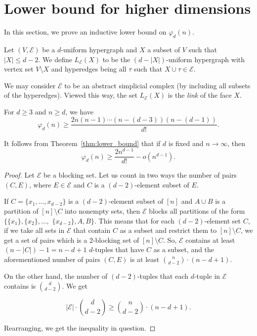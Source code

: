 \documentclass[11pt,a4paper]{article}
\begin{document}
\section{Lower bound for higher dimensions}\label{sec:lbhighd}

In this section, we prove an inductive lower bound on $\varphi_d(n)$.

\begin{definition}
    Let $(V,\mathcal{E})$ be a $d$-uniform hypergraph and $X$ a subset of $V$ such that $\lvert X \rvert \leq d-2$. We define $L_{\mathcal{E}}(X)$ to be the $(d-|X|)$-uniform hypergraph with vertex set $V \setminus X$ and hyperedges being all $\tau$ such that $X \cup \tau \in \mathcal{E}$.
\end{definition}
We may consider $\mathcal{E}$ to be an abstract simplicial complex (by including all subsets of the hyperedges). Viewed this way, the set $L_{\mathcal{E}}(X)$ is the {\em link} of the face $X$.


\begin{theorem}
\label{thm:lower_bound}
    For $d \geq 3$ and $n \geq d$, we have
    \[\varphi_d(n) \geq \frac{ 2 n (n-1) \cdots (n-(d-3)) (n-(d-1))}{d!}.\]
\end{theorem}
It follows from Theorem~\ref{thm:lower_bound} that if $d$ is fixed and $n\to \infty$, then
\[
    \varphi_d(n) \geq \frac{2 n^{d-1}}{d!} -o(n^{d-1}).
\]

\begin{proof}
    Let $\mathcal{E}$ be a blocking set. Let us count in two ways the number of pairs $(C,E)$, where $E\in \mathcal{E}$ and $C$ is a $(d-2)$-element subset of $E$.


    If $C=\{x_1,\dots,x_{d-2}\}$ is a $(d-2)$-element subset of  $[n]$ and $A\cup B$ is a partition of $[n]\setminus C$ into nonempty sets, then
    $\mathcal{E}$ blocks all partitions of the form $\{\{x_1\},\{x_2\},\dots,$ $\{x_{d-2}\},A,B\}$. This means that for each $(d-2)$-element set  $C$, if we take all sets in $\mathcal{E}$ that contain $C$ as a subset and restrict them to $[n]\setminus C$, we get a set of pairs which is a 2-blocking set of $[n]\setminus C$. So, $\mathcal{E}$ contains at least $(n-|C|)-1=n-d+1$ $d$-tuples that have $C$ as a subset, and the aforementioned number of pairs $(C,E)$ is at least $\binom{n}{d-2} \cdot (n-d+1)$.

    On the other hand, the number of $(d-2)$-tuples that each $d$-tuple in $\mathcal{E}$ contains is $\binom{d}{d-2}$. We get

    \[ |\mathcal{E}|\cdot \binom{d}{d-2}\geq \binom{n}{d-2}\cdot (n-d+1).
    \]

    Rearranging, we get the inequality in question.
\end{proof}
\end{document}
